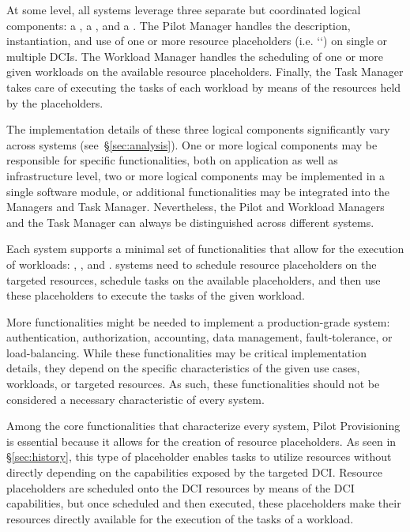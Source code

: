 \documentclass{sig-alternate}
\begin{document}
At some level, all \pilot systems leverage three separate but coordinated
logical components: a , a , and a
. The Pilot Manager handles the description, instantiation,
and use of one or more resource placeholders (i.e. `\pilots`) on single or
multiple DCIs. The Workload Manager handles the scheduling of one or more given
workloads on the available resource placeholders. Finally, the Task Manager
takes care of executing the tasks of each workload by means of the resources
held by the placeholders.

The implementation details of these three logical components significantly vary
across \pilot systems (see~\S\ref{sec:analysis}). One or more logical
components may be responsible for specific functionalities, both on application
as well as infrastructure level, two or more logical components may be
implemented in a single software module, or additional functionalities may be
integrated into the Managers and Task Manager. Nevertheless, the Pilot and
Workload Managers and the Task Manager can always be distinguished across
different \pilot systems.


Each \pilot system supports a minimal set of functionalities that allow for the
execution of workloads: , ,
and . \pilot systems need to schedule resource
placeholders on the targeted resources, schedule tasks on the available
placeholders, and then use these placeholders to execute the tasks of the given
workload.

More functionalities might be needed to implement a production-grade \pilot
system: authentication, authorization, accounting, data management,
fault-tolerance, or load-balancing. While these functionalities may be critical
implementation details, they depend on the specific characteristics of the
given use cases, workloads, or targeted resources. As such, these
functionalities should not be considered a necessary characteristic of every
\pilot system.

Among the core functionalities that characterize every \pilot system, Pilot
Provisioning is essential because it allows for the creation of resource
placeholders. As seen in \S\ref{sec:history}, this type of placeholder enables
tasks to utilize resources without directly depending on the capabilities
exposed by the targeted DCI. Resource placeholders are scheduled onto the DCI
resources by means of the DCI capabilities, but once scheduled and then
executed, these placeholders make their resources directly available for the
execution of the tasks of a workload.
\end{document}
